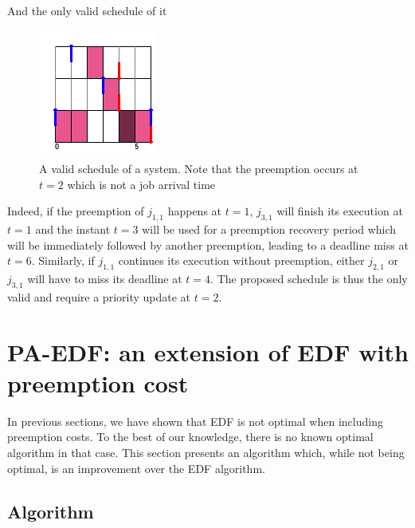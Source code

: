 \documentclass[a4paper,10pt]{article}
\begin{document}
        And the only valid schedule of it

        \begin{figure}[H]
        \begin{center}
            \includegraphics[scale=0.7]{figs/mpana.png}
            \caption{A valid schedule of a system. Note that the preemption occurs at $t=2$ which is not a job arrival time}
            \label{fig:mpana}
        \end{center}
        \end{figure}

        Indeed, if the preemption of $j_{1,1}$ happens at $t=1$, $j_{3,1}$ will finish its execution at $t=1$ and the instant $t=3$ will be used for a preemption recovery period which will be immediately followed by another preemption, leading to a deadline miss at $t=6$. Similarly, if $j_{1,1}$ continues its execution without preemption, either $j_{2,1}$ or $j_{3,1}$ will have to miss its deadline at $t=4$. The proposed schedule is thus the only valid and require a priority update at $t=2$.

\section{PA-EDF: an extension of EDF with preemption cost}


    In previous sections, we have shown that EDF is not optimal when including preemption costs. To the best of our knowledge, there is no known optimal algorithm in that case. This section presents an algorithm which, while not being optimal, is an improvement over the EDF algorithm.

    \subsection{Algorithm}
\end{document}
